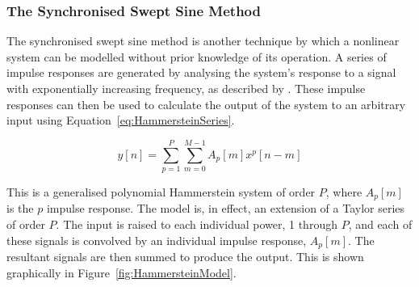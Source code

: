 		\subsubsection{The Synchronised Swept Sine Method}
			The synchronised swept sine method is another technique by which a nonlinear system can be modelled
			without prior knowledge of its operation. A series of impulse responses are generated by analysing
			the system's response to a signal with exponentially increasing frequency, as described by
			\citet{novak2010nonlinear}. These impulse responses can then be used to calculate the output of the
			system to an arbitrary input using Equation~\ref{eq:HammersteinSeries}.

			\begin{equation}
				y[n] = \sum_{p = 1}^{P}
					\sum_{m = 0}^{M - 1} A_{p}[m]x^{p}[n-m]
				\label{eq:HammersteinSeries}
			\end{equation}

			This is a generalised polynomial Hammerstein system of order $P$, where $A_{p}[m]$ is the
			$p$ impulse response. The model is, in effect, an extension of a Taylor series of order
			$P$. The input is raised to each individual power, 1 through $P$, and each of these signals is
			convolved by an individual impulse response, $A_{p}[m]$. The resultant signals are then summed to
			produce the output. This is shown graphically in Figure~\ref{fig:HammersteinModel}.

